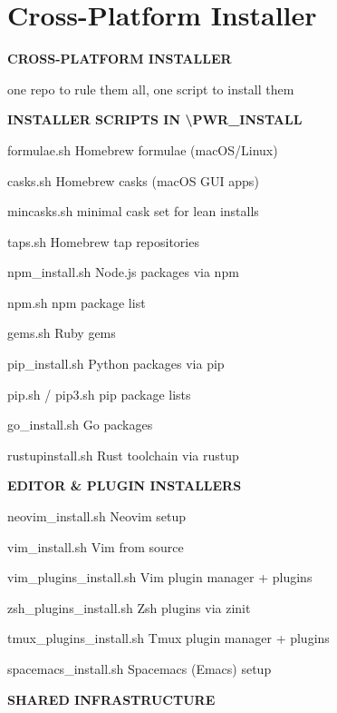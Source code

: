 \documentclass[11pt,a4paper,twoside]{book}
\begin{document}
\vspace{16pt}

\section{Cross-Platform Installer}


\vspace{10pt}
{\large\bfseries\color{neoncyan} CROSS-PLATFORM INSTALLER}\vspace{6pt}

one repo to rule them all, one script to install them


\vspace{12pt}
{\bfseries\color{neonyellow} INSTALLER SCRIPTS IN \textbackslash{}PWR\_INSTALL}\vspace{4pt}

formulae.sh        Homebrew formulae (macOS/Linux)

casks.sh           Homebrew casks (macOS GUI apps)

mincasks.sh        minimal cask set for lean installs

taps.sh            Homebrew tap repositories

npm\_install.sh     Node.js packages via npm

npm.sh             npm package list

gems.sh            Ruby gems

pip\_install.sh     Python packages via pip

pip.sh / pip3.sh   pip package lists

go\_install.sh      Go packages

rustupinstall.sh   Rust toolchain via rustup


\vspace{12pt}
{\bfseries\color{neonyellow} EDITOR \& PLUGIN INSTALLERS}\vspace{4pt}

neovim\_install.sh       Neovim setup

vim\_install.sh          Vim from source

vim\_plugins\_install.sh  Vim plugin manager + plugins

zsh\_plugins\_install.sh  Zsh plugins via zinit

tmux\_plugins\_install.sh Tmux plugin manager + plugins

spacemacs\_install.sh    Spacemacs (Emacs) setup


\vspace{12pt}
{\bfseries\color{neonyellow} SHARED INFRASTRUCTURE}\vspace{4pt}
\end{document}
